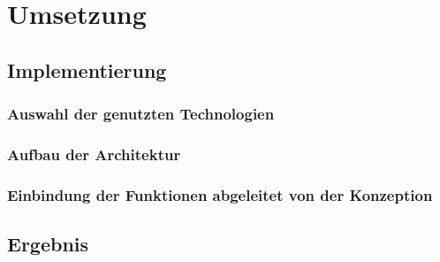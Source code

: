 \chapter{Umsetzung}
\label{chap:umsetzung}
\section{Implementierung}
\subsection{Auswahl der genutzten Technologien}
\subsection{Aufbau der Architektur}
\subsection{Einbindung der Funktionen abgeleitet von der Konzeption}
\section{Ergebnis}